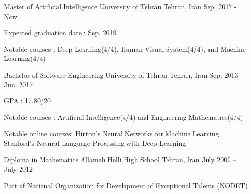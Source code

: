 

\begin{cventries}
  
  \cventry
    {Master of Artificial Intelligence} %
    {University of Tehran} %
    {Tehran, Iran} %
    {Sep. 2017 - Now} %
    {
      \begin{cvitems} %
        \item {Expected graduation date : Sep. 2019}
        \item {Notable courses : Deep Learning(4/4), Human Visual System(4/4), and Machine Learning(4/4)}
      \end{cvitems}
    }
  \cventry
    {Bachelor of Software Engineering} %
    {University of Tehran} %
    {Tehran, Iran} %
    {Sep. 2013 - Jun. 2017} %
    {
      \begin{cvitems} %
        \item {GPA : 17.80/20}
        \item {Notable courses : Artificial Intelligence(4/4) and Engineering Mathematics(4/4)}
        \item {Notable online courses: Hinton's Neural Networks for Machine Learning, Stanford's Natural Language Processing with Deep Learning}
      \end{cvitems}
    }
    
  \cventry
  	{Diploma in Mathematics}
  	{Allameh Helli High School}
  	{Tehran, Iran}
  	{July 2009 – July 2012}
  	{
      \begin{cvitems} %
        \item {Part of National Organization for Development of Exceptional Talents (NODET)}
      \end{cvitems}
    }

\end{cventries}
